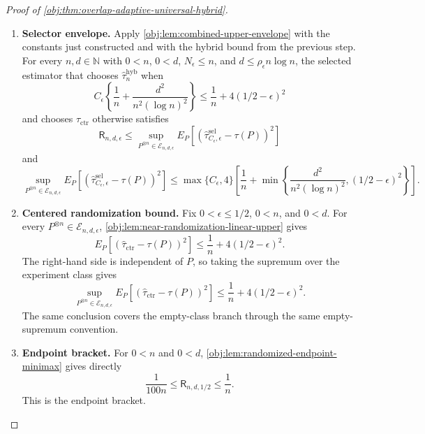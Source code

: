 \begin{proof}[Proof of \cref{obj:thm:overlap-adaptive-universal-hybrid}]
\begin{enumerate}
\item \textbf{Selector envelope.}
Apply \cref{obj:lem:combined-upper-envelope} with the constants just constructed and with the hybrid bound from the previous step.  For every \(n,d\in\mathbb N\) with \(0<n\), \(0<d\), \(N_\epsilon\le n\), and \(d\le\rho_\epsilon n\log n\), the selected estimator that chooses \(\widehat\tau_n^{\mathrm{hyb}}\) when
\[
C_\epsilon\left\{\frac1n+\frac{d^2}{n^2(\log n)^2}\right\}
\le
\frac1n+4(1/2-\epsilon)^2
\]
and chooses \(\widehat\tau_{\mathrm{ctr}}\) otherwise satisfies
\[
\mathsf R_{n,d,\epsilon}
\le
\sup_{P^{\otimes n}\in\mathcal E_{n,d,\epsilon}}
E_P\!\left[
\left(\widehat\tau^{\mathrm{sel}}_{C_\epsilon,\epsilon}-\tau(P)\right)^2
\right]
\]
and
\[
\sup_{P^{\otimes n}\in\mathcal E_{n,d,\epsilon}}
E_P\!\left[
\left(\widehat\tau^{\mathrm{sel}}_{C_\epsilon,\epsilon}-\tau(P)\right)^2
\right]
\le
\max\{C_\epsilon,4\}
\left[
\frac1n+
\min\left\{
\frac{d^2}{n^2(\log n)^2},
(1/2-\epsilon)^2
\right\}
\right].
\]

\item \textbf{Centered randomization bound.}
Fix \(0<\epsilon\le1/2\), \(0<n\), and \(0<d\).  For every \(P^{\otimes n}\in\mathcal E_{n,d,\epsilon}\), \cref{obj:lem:near-randomization-linear-upper} gives
\[
E_P\!\left[
\left(\widehat\tau_{\mathrm{ctr}}-\tau(P)\right)^2
\right]
\le
\frac1n+4(1/2-\epsilon)^2 .
\]
The right-hand side is independent of \(P\), so taking the supremum over the experiment class gives
\[
\sup_{P^{\otimes n}\in\mathcal E_{n,d,\epsilon}}
E_P\!\left[
\left(\widehat\tau_{\mathrm{ctr}}-\tau(P)\right)^2
\right]
\le
\frac1n+4(1/2-\epsilon)^2 .
\]
The same conclusion covers the empty-class branch through the same empty-supremum convention.

\item \textbf{Endpoint bracket.}
For \(0<n\) and \(0<d\), \cref{obj:lem:randomized-endpoint-minimax} gives directly
\[
\frac{1}{100n}
\le
\mathsf R_{n,d,1/2}
\le
\frac1n .
\]
This is the endpoint bracket.
\end{enumerate}
\end{proof}
